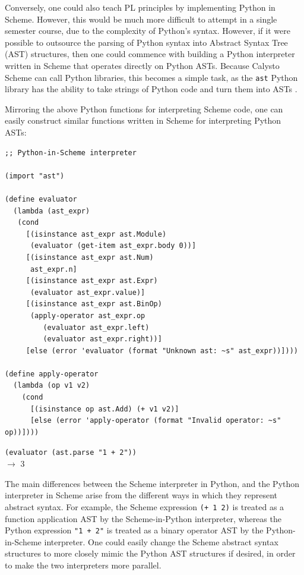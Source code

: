 \documentclass[acmsmall,screen,authorversion]{acmart}
\begin{document}
\noindent
Conversely, one could also teach PL principles by implementing Python in
Scheme. However, this would be much more difficult to attempt in a single
semester course, due to the complexity of Python's syntax. However, if it were
possible to outsource the parsing of Python syntax into Abstract Syntax Tree
(AST) structures, then one could commence with building a Python interpreter
written in Scheme that operates directly on Python ASTs. Because Calysto Scheme
can call Python libraries, this becomes a simple task, as the \texttt{ast}
Python library has the ability to take strings of Python code and turn them
into ASTs \cite{PythonInScheme}.

Mirroring the above Python functions for interpreting Scheme code, one can
easily construct similar functions written in Scheme for interpreting Python
ASTs:\\

\begin{minipage}{\textwidth}
{\small
\begin{verbatim}
;; Python-in-Scheme interpreter

(import "ast")

(define evaluator
  (lambda (ast_expr)
   (cond
     [(isinstance ast_expr ast.Module)
      (evaluator (get-item ast_expr.body 0))]
     [(isinstance ast_expr ast.Num)
      ast_expr.n]
     [(isinstance ast_expr ast.Expr)
      (evaluator ast_expr.value)]
     [(isinstance ast_expr ast.BinOp)
      (apply-operator ast_expr.op
         (evaluator ast_expr.left)
         (evaluator ast_expr.right))]
     [else (error 'evaluator (format "Unknown ast: ~s" ast_expr))])))

(define apply-operator
  (lambda (op v1 v2)
    (cond
      [(isinstance op ast.Add) (+ v1 v2)]
      [else (error 'apply-operator (format "Invalid operator: ~s" op))])))

\end{verbatim}
\texttt{(evaluator (ast.parse "1 + 2"))}\\
$\rightarrow$ 3\\
}
\end{minipage}

\noindent
The main differences between the Scheme interpreter in Python, and the Python
interpreter in Scheme arise from the different ways in which they represent
abstract syntax.  For example, the Scheme expression \texttt{(+~1~2)} is
treated as a function application AST by the Scheme-in-Python interpreter,
whereas the Python expression \texttt{"1~+~2"} is treated as a binary operator
AST by the Python-in-Scheme interpreter.  One could easily change the Scheme
abstract syntax structures to more closely mimic the Python AST structures if
desired, in order to make the two interpreters more parallel.
\end{document}
